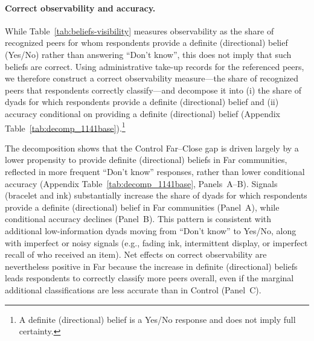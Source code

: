 \documentclass[12pt,a4paper]{article}
\begin{document}
\paragraph{Correct observability and accuracy.}
While Table~\ref{tab:beliefs-visibility} measures observability as the share of recognized peers for whom respondents provide a definite (directional) belief (Yes/No) rather than answering ``Don't know'', this does not imply that such beliefs are correct. Using administrative take-up records for the referenced peers, we therefore construct a correct observability measure---the share of recognized peers that respondents correctly classify---and decompose it into (i) the share of dyads for which respondents provide a definite (directional) belief and (ii) accuracy conditional on providing a definite (directional) belief (Appendix Table~\ref{tab:decomp_1141base}).\footnote{A definite (directional) belief is a Yes/No response and does not imply full certainty.}

The decomposition shows that the Control Far--Close gap is driven largely by a lower propensity to provide definite (directional) beliefs in Far communities, reflected in more frequent ``Don't know'' responses, rather than lower conditional accuracy (Appendix Table~\ref{tab:decomp_1141base}, Panels~A--B). Signals (bracelet and ink) substantially increase the share of dyads for which respondents provide a definite (directional) belief in Far communities (Panel~A), while conditional accuracy declines (Panel~B). This pattern is consistent with additional low-information dyads moving from ``Don't know'' to Yes/No, along with imperfect or noisy signals (e.g., fading ink, intermittent display, or imperfect recall of who received an item). Net effects on correct observability are nevertheless positive in Far because the increase in definite (directional) beliefs leads respondents to correctly classify more peers overall, even if the marginal additional classifications are less accurate than in Control (Panel~C).%

\end{document}

